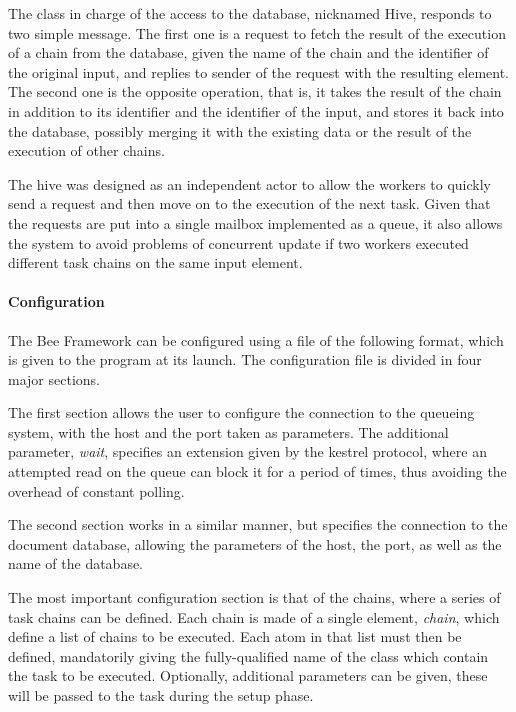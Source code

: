 The class in charge of the access to the database, nicknamed Hive, responds to two simple message. The first one is a request to fetch the result of the execution of a chain from the database, given the name of the chain and the identifier of the original input, and replies to sender of the request with the resulting element. The second one is the opposite operation, that is, it takes the result of the chain in addition to its identifier and the identifier of the input, and stores it back into the database, possibly merging it with the existing data or the result of the execution of other chains.

The hive was designed as an independent actor to allow the workers to quickly send a request and then move on to the execution of the next task. Given that the requests are put into a single mailbox implemented as a queue, it also allows the system to avoid problems of concurrent update if two workers executed different task chains on the same input element.


\paragraph{Configuration} %
\label{par:configuration}

The Bee Framework can be configured using a file of the following format, which is given to the program at its launch. The configuration file is divided in four major sections.

The first section allows the user to configure the connection to the queueing system, with the host and the port taken as parameters. The additional parameter, \emph{wait}, specifies an extension given by the kestrel protocol, where an attempted read on the queue can block it for a period of times, thus avoiding the overhead of constant polling.

The second section works in a similar manner, but specifies the connection to the document database, allowing the parameters of the host, the port, as well as the name of the database.

The most important configuration section is that of the chains, where a series of task chains can be defined. Each chain is made of a single element, \emph{chain}, which define a list of chains to be executed. Each atom in that list must then be defined, mandatorily giving the fully-qualified name of the class which contain the task to be executed. Optionally, additional parameters can be given, these will be passed to the task during the setup phase.

